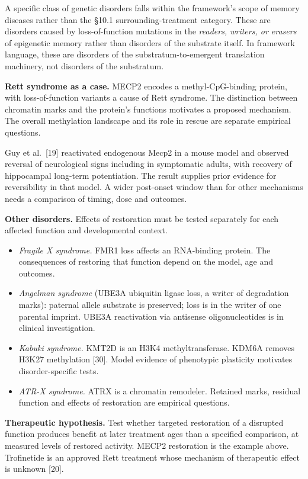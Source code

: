 \documentclass[
]{article}
\providecommand{\tightlist}{%
  \setlength{\itemsep}{0pt}\setlength{\parskip}{0pt}}
\begin{document}
A specific class of genetic disorders falls within the framework's scope
of memory diseases rather than the §10.1 surrounding-treatment category.
These are disorders caused by loss-of-function mutations in the
\emph{readers, writers, or erasers} of epigenetic memory rather than
disorders of the substrate itself. In framework language, these are
disorders of the substratum-to-emergent translation machinery, not
disorders of the substratum.

\textbf{Rett syndrome as a case.} MECP2 encodes a methyl-CpG-binding
protein, with loss-of-function variants a cause of Rett syndrome. The
distinction between chromatin marks and the protein's functions
motivates a proposed mechanism. The overall methylation landscape and
its role in rescue are separate empirical questions.

Guy et al.~{[}19{]} reactivated endogenous Mecp2 in a mouse model and
observed reversal of neurological signs including in symptomatic adults,
with recovery of hippocampal long-term potentiation. The result supplies
prior evidence for reversibility in that model. A wider post-onset
window than for other mechanisms needs a comparison of timing, dose and
outcomes.

\textbf{Other disorders.} Effects of restoration must be tested
separately for each affected function and developmental context.

\begin{itemize}
\tightlist
\item
  \emph{Fragile X syndrome.} FMR1 loss affects an RNA-binding protein.
  The consequences of restoring that function depend on the model, age
  and outcomes.
\item
  \emph{Angelman syndrome} (UBE3A ubiquitin ligase loss, a writer of
  degradation marks): paternal allele substrate is preserved; loss is in
  the writer of one parental imprint. UBE3A reactivation via antisense
  oligonucleotides is in clinical investigation.
\item
  \emph{Kabuki syndrome.} KMT2D is an H3K4 methyltransferase. KDM6A
  removes H3K27 methylation {[}30{]}. Model evidence of phenotypic
  plasticity motivates disorder-specific tests.
\item
  \emph{ATR-X syndrome.} ATRX is a chromatin remodeler. Retained marks,
  residual function and effects of restoration are empirical questions.
\end{itemize}

\textbf{Therapeutic hypothesis.} Test whether targeted restoration of a
disrupted function produces benefit at later treatment ages than a
specified comparison, at measured levels of restored activity. MECP2
restoration is the example above. Trofinetide is an approved Rett
treatment whose mechanism of therapeutic effect is unknown {[}20{]}.
\end{document}
